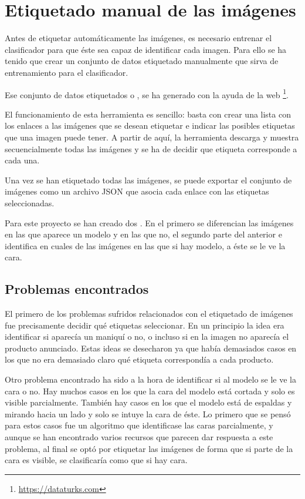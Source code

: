
\section{Etiquetado manual de las imágenes}

Antes de etiquetar automáticamente las imágenes, es necesario entrenar el clasificador para que éste sea capaz de identificar cada imagen. Para ello se ha tenido que crear un conjunto de datos etiquetado manualmente que sirva de entrenamiento para el clasificador.

Ese conjunto de datos etiquetados o , se ha generado con la ayuda de la web \footnote{\url{https://dataturks.com}}.

El funcionamiento de esta herramienta es sencillo: basta con crear una lista con los enlaces a las imágenes que se desean etiquetar e indicar las posibles etiquetas que una imagen puede tener. A partir de aquí, la herramienta descarga y muestra secuencialmente todas las imágenes y se ha de decidir que etiqueta corresponde a cada una.


Una vez se han etiquetado todas las imágenes, se puede exportar el conjunto de imágenes como un archivo JSON que asocia cada enlace con las etiquetas seleccionadas.

Para este proyecto se han creado dos . En el primero se diferencian las imágenes en las que aparece un modelo y en las que no, el segundo  parte del anterior e identifica en cuales de las imágenes en las que si hay modelo, a éste se le ve la cara.

\subsection{Problemas encontrados}

El primero de los problemas sufridos relacionados con el etiquetado de imágenes fue precisamente decidir qué etiquetas seleccionar. En un principio la idea era identificar si aparecía un maniquí o no, o incluso si en la imagen no aparecía el producto anunciado. Estas ideas se desecharon ya que había demasiados casos en los que no era demasiado claro qué etiqueta correspondía a cada producto.

Otro problema encontrado ha sido a la hora de identificar si al modelo se le ve la cara o no. Hay muchos casos en los que la cara del modelo está cortada y solo es visible parcialmente. También hay casos en los que el modelo está de espaldas y mirando hacia un lado y solo se intuye la cara de éste. Lo primero que se pensó para estos casos fue un algoritmo que identificase las caras parcialmente, y aunque se han encontrado varios recursos que parecen dar respuesta a este problema, al final se optó por etiquetar las imágenes de forma que si parte de la cara es visible, se clasificaría como que si hay cara.

